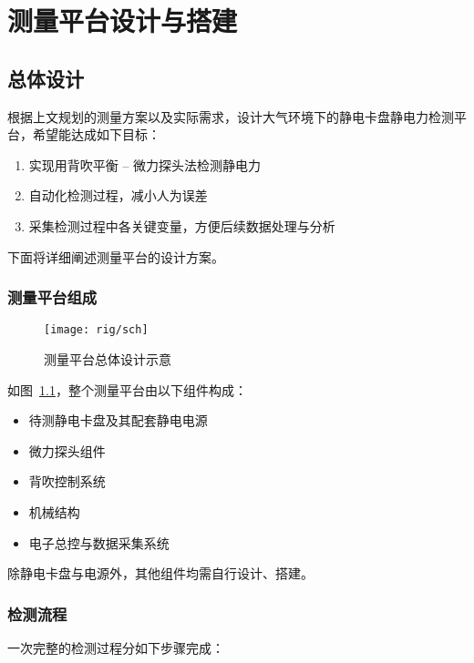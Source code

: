 \chapter{测量平台设计与搭建}



\section{总体设计}\label{sec:rig-overall}

根据上文规划的测量方案以及实际需求，设计大气环境下的静电卡盘静电力检测平台，希望能达成如下目标：

\begin{enumerate}
  \item 实现用背吹平衡 -- 微力探头法检测静电力
  \item 自动化检测过程，减小人为误差
  \item 采集检测过程中各关键变量，方便后续数据处理与分析
\end{enumerate}

下面将详细阐述测量平台的设计方案。


\subsection{测量平台组成}\label{sec:rig-overall-comp}

\begin{figure}[tbh]
\centering
\texttt{[image: rig/sch]}
\caption{测量平台总体设计示意}
\label{fig:rig-sch}
\end{figure}

如图~\ref{fig:rig-sch}，整个测量平台由以下组件构成：

\begin{itemize}
  \item 待测静电卡盘及其配套静电电源
  \item 微力探头组件
  \item 背吹控制系统
  \item 机械结构
  \item 电子总控与数据采集系统
\end{itemize}

除静电卡盘与电源外，其他组件均需自行设计、搭建。


\subsection{检测流程}

一次完整的检测过程分如下步骤完成：

